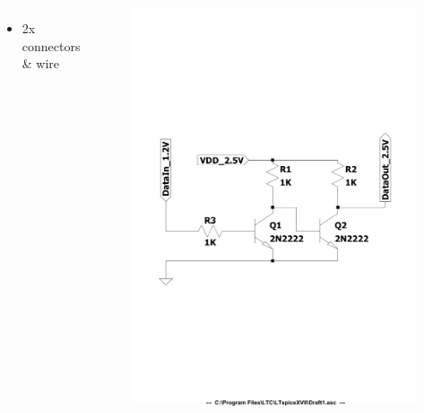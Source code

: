 \documentclass[aspectratio=169]{beamer}
\begin{document}
\begin{frame}
\begin{columns}
\begin{itemize}
			\item 2x connectors \& wire
		\end{itemize}
		\begin{figure}
			\includegraphics[width=0.6 \textwidth]{IMG/Diagram_cropped.pdf}
		\end{figure}
	\end{columns}
				
	
	
	\end{frame}
\end{document}
